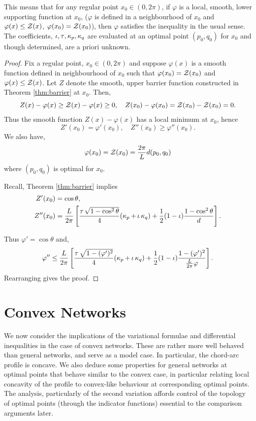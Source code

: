 \documentclass[11pt]{amsart}
\begin{document}
This means that for any regular point \(x_0 \in (0,2\pi)\), if \(\varphi\) is a local, smooth, lower supporting function at \(x_0\), (\(\varphi\) is defined in a neighbourhood of \(x_0\) and \(\varphi(x) \leq \operatorname{\mathcal{Z}} (x)\), \(\varphi(x_0) = \operatorname{\mathcal{Z}} (x_0)\)), then \(\varphi\) satisfies the inequality in the usual sense. The coefficients, \(\operatorname{\iota}, \operatorname{\tau}, \operatorname{\kappa}_p, \operatorname{\kappa}_q\) are evaluated at an optimal point \((p_0, q_0)\) for \(x_0\) and though determined, are a priori unknown.

\begin{proof}
Fix a regular point, $x_0 \in (0,2\pi)$ and suppose $\varphi(x)$ is a smooth function defined in neighbourhood of $x_0$ such that $\varphi(x_0) = \operatorname{\mathcal{Z}}(x_0)$ and $\varphi(x) \leq \operatorname{\mathcal{Z}}(x)$. Let \(Z\) denote the smooth, upper barrier function constructed in Theorem \ref{thm:barrier} at \(x_0\). Then,
\[
Z(x) - \varphi(x) \geq \operatorname{\mathcal{Z}}(x) - \varphi(x) \geq 0, \quad Z(x_0) - \varphi(x_0) = \operatorname{\mathcal{Z}}(x_0) - \operatorname{\mathcal{Z}}(x_0) = 0.
\]
Thus the smooth function \(Z(x) - \varphi(x)\) has a local minimum at \(x_0\), hence
\[
Z'(x_0) = \varphi'(x_0), \quad Z''(x_0) \geq \varphi''(x_0).
\]
We also have,
\[
\varphi(x_0) = \operatorname{\mathcal{Z}}(x_0) = \frac{2\pi}{L} d(p_0, q_0)
\]
where \((p_0, q_0)\) is optimal for \(x_0\).

Recall, Theorem \ref{thm:barrier} implies
\begin{align*}
Z'(x_0) &= \cos \theta, \\
Z''(x_0) &= \frac{L}{2\pi}\left[\frac{\operatorname{\tau}\sqrt{1-\cos^2\theta}}{4} (\operatorname{\kappa}_p + \operatorname{\iota}\operatorname{\kappa}_q) + \frac{1}{2} (1-\operatorname{\iota}) \frac{1-\cos^2\theta}{d}\right].
\end{align*}

Thus \(\varphi' = \cos \theta\) and,
\[
\varphi'' \leq \frac{L}{2\pi}\left[\frac{\operatorname{\tau}\sqrt{1-(\varphi')^2}}{4} (\operatorname{\kappa}_p + \operatorname{\iota}\operatorname{\kappa}_q) + \frac{1}{2} (1-\operatorname{\iota}) \frac{1-(\varphi')^2}{\tfrac{L}{2\pi} \varphi}\right].
\]
Rearranging gives the proof.
\end{proof}

\section{Convex Networks}

We now consider the implications of the variational formulae and differential inequalities in the case of convex networks. These are rather more well behaved than general networks, and serve as a model case. In particular, the chord-arc profile is concave. We also deduce some properties for general networks at optimal points that behave similar to the convex case, in particular relating local concavity of the profile to convex-like behaviour at corresponding optimal points. The analysis, particularly of the second variation affords control of the topology of optimal points (through the indicator functions) essential to the comparison arguments later.
\end{document}
